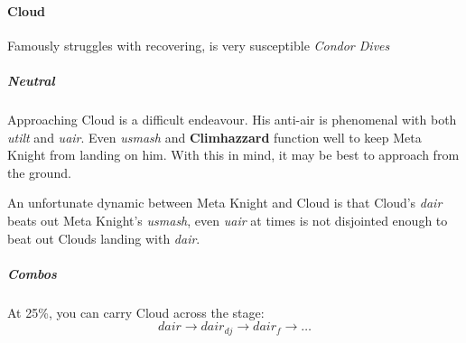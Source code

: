 \paragraph{Cloud}

Famously struggles with recovering, is very susceptible \textit{Condor Dives}

\subparagraph{Neutral}
Approaching Cloud is a difficult endeavour. His anti-air is phenomenal with both \textit{utilt} and \textit{uair}. Even \textit{usmash} and \textbf{Climhazzard} function well to keep Meta Knight from landing on him. With this in mind, it may be best to approach from the ground.

An unfortunate dynamic between Meta Knight and Cloud is that Cloud's \textit{dair} beats out Meta Knight's \textit{usmash}, even \textit{uair} at times is not disjointed enough to beat out Clouds landing with \textit{dair}.

\subparagraph{Combos}
At 25\%, you can carry Cloud across the stage:
\[
	dair \to dair_{dj} \to dair_{f} \to \hdots
\]